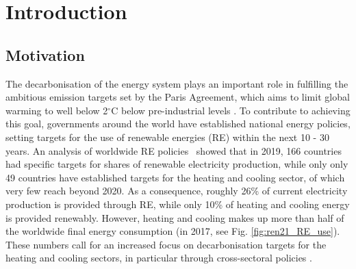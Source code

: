 \cleardoublepage
\chapter{Introduction}
\label{intro}

\section{Motivation}
\label{intro_motivation}


The decarbonisation of the energy system plays an important role in fulfilling the ambitious emission targets set by the Paris Agreement, which aims to limit global warming to well below 2$^\circ$C below pre-industrial levels \cite{rogelj_paris_2016}.
To contribute to achieving this goal, governments around the world have established national energy policies, setting targets for the use of renewable energies (RE) within the next 10 - 30 years. 
An analysis of worldwide RE policies~\cite{ren21_renewables_2020} showed that in 2019, 166 countries had specific targets for shares of renewable electricity production, while only only 49 countries have established targets for the heating and cooling sector, of which very few reach beyond 2020. 
As a consequence, roughly 26\% of current electricity production is provided through RE, while only 10\% of heating and cooling energy is provided renewably. However, heating and cooling makes up more than half of the worldwide final energy consumption (in 2017, see Fig. \ref{fig:ren21_RE_use}). These numbers call for an increased focus on decarbonisation targets for the heating and cooling sectors, in particular through cross-sectoral policies  \cite{ren21_renewables_2020}.


